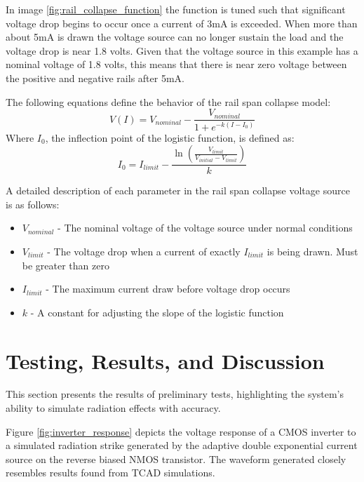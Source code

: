 \documentclass[conference]{IEEEtran}
\begin{document}
    In image \ref{fig:rail_collapse_function} the function is tuned such that significant voltage drop begins to occur once a current of 3mA is exceeded.
    When more than about 5mA is drawn the voltage source can no longer sustain the load and the voltage drop is near 1.8 volts.
    Given that the voltage source in this example has a nominal voltage of 1.8 volts, this means that there is near zero voltage between the positive and negative rails after 5mA\@.

    The following equations define the behavior of the rail span collapse model:
            {\Large
    \[V(I)=V_{nominal}-\frac{V_{nominal}}{1+e^{-k(I-I_0)}}\]
    }
    Where \(I_0\), the inflection point of the logistic function, is defined as:
            {\Large
    \[I_0=I_{limit}-\frac{\ln\left(\frac{V_{limit}}{V_{initial}-V_{limit}}\right)}{k}\]
    }

    A detailed description of each parameter in the rail span collapse voltage source is as follows:

    \begin{itemize}

        \item[] \(V_{nominal}\) - The nominal voltage of the voltage source under normal conditions

        \item[] \(V_{limit}\) - The voltage drop when a current of exactly \(I_{limit}\) is being drawn.
        Must be greater than zero

        \item[] \(I_{limit}\) - The maximum current draw before voltage drop occurs

        \item[] \(k\) - A constant for adjusting the slope of the logistic function

    \end{itemize}




    \section{Testing, Results, and Discussion}\label{sec:testing-results-and-discussion}
    This section presents the results of preliminary tests, highlighting the system's ability to simulate radiation effects with accuracy.
    
    Figure \ref{fig:inverter_response} depicts the voltage response of a CMOS inverter to a simulated radiation strike generated by the adaptive double exponential current source on the reverse biased NMOS transistor. The waveform generated closely resembles results found from TCAD simulations. \cite{Kauppila2009}
    
\end{document}
